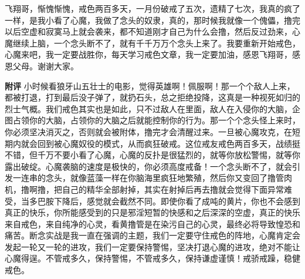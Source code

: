 \begin{case}
    飞翔哥，惭愧惭愧，戒色两百多天，一月份破戒了五次，遗精了七次，我真的疯了一样，是我小看了心魔，我做了念头的奴隶，真的，那时候我就像一个傀儡，撸完以后空虚和寂寞马上就会袭来，都不知道刚才自己为什么会撸，然后反过劲来，心魔继续上脑，一个念头断不了，就有千千万万个念头上来了。我要重新开始戒色，心魔来吧，我一定要战胜你，每天学习戒色文章，我一定要加油，感恩飞翔哥，感恩父母。谢谢大家。

    \textbf{附评} 小时候看狼牙山五壮士的电影，觉得英雄啊！佩服啊！那一个个敌人上来，都被打退，打到最后没子弹了，就扔石头，总之拒绝投降，这真是一种视死如归的烈士气概。我们戒色其实也是如此，只不过敌人在里面，敌人在入侵你的大脑，企图占领你的大脑，占领你的大脑之后就能控制你的行为。那一个个念头怪上来时，你必须坚决消灭之，否则就会被附体，撸完才会清醒过来。一旦被心魔攻克，在短期内就会回到被心魔奴役的模式，从而疯狂破戒。这位戒友戒色两百多天，战绩挺不错，但千万不要小看了心魔，心魔的反扑是很猛烈的，就等你放松警惕，就等你露出破绽。心魔袭脑的速度是极快的，你必须高度戒备！一个念头断不了，就会引发一连串的念头，就像蓝藻一样在你脑海里疯狂地繁殖，然后你又变回了撸管肉机，撸啊撸，把自己的精华全部射掉，其实在射掉后再去撸就会觉得下面异常难受，当多巴胺下降后，感觉就会截然不同。即使你看了成吨的黄片，你也不会感到真正的快乐，你所能感受到的只是邪淫短暂的快感和之后深深的空虚，真正的快乐来自戒色，来自纯净的心灵，看黄撸管是在染污自己的心灵，最终必将导致惶恐和痛苦。断念实战是我一直在强调的主题，我们一定要守住戒色的阵地，心魔肯定会发起一轮又一轮的进攻，我们一定要保持警惕，坚决打退心魔的进攻，绝对不能让心魔得逞。不管戒多久，保持警惕，不管戒多久，保持谦虚谨慎！戒骄戒躁，稳健戒色。
\end{case}

